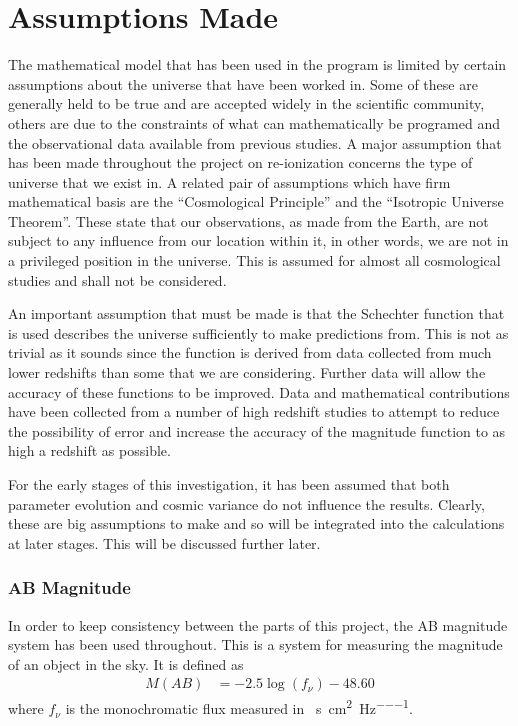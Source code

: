 
\section{Assumptions Made} %
\label{sec:assumptions_made}
	The mathematical model that has been used in the program is limited by certain assumptions about the universe that have been worked in. Some of these are generally held to be true and are accepted widely in the scientific community, others are due to the constraints of what can mathematically be programed and the observational data available from previous studies. A major assumption that has been made throughout the project on re-ionization concerns the type of universe that we exist in. A related pair of assumptions which have firm mathematical basis are the ``Cosmological Principle'' and the ``Isotropic Universe Theorem''. These state that our observations, as made from the Earth, are not subject to any influence from our location within it, in other words, we are not in a privileged position in the universe. This is assumed for almost all cosmological studies and shall not be considered.

	An important assumption that must be made is that the Schechter function that is used describes the universe sufficiently to make predictions from. This is not as trivial as it sounds since the function is derived from data collected from much lower redshifts than some that we are considering. Further data will allow the accuracy of these functions to be improved. Data and mathematical contributions have been collected from a number of high redshift studies to attempt to reduce the possibility of error and increase the accuracy of the magnitude function to as high a redshift as possible.

	For the early stages of this investigation, it has  been assumed that both parameter evolution and cosmic variance do not influence the results. Clearly, these are big assumptions to make and so will be integrated into the calculations at later stages. This will be discussed further later.

	\subsubsection{AB Magnitude} %
	\label{ssub:ab_magnitude}
		In order to keep consistency between the parts of this project, the AB magnitude system has been used throughout. This is a system for measuring the magnitude of an object in the sky. It is defined as
		\begin{align}
			M(AB) &= -2.5\log(f_\nu) -48.60 \label{eq:ab_magnitude}
		\end{align}
		where $f_\nu$ is the monochromatic flux measured in \si{\erg\per\second\per\square\centi\metre\per\hertz}.

